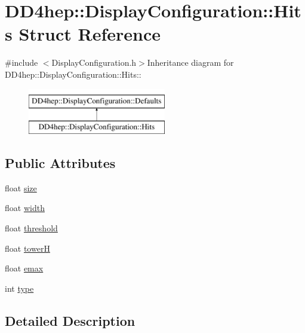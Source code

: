 \hypertarget{struct_d_d4hep_1_1_display_configuration_1_1_hits}{
\section{DD4hep::DisplayConfiguration::Hits Struct Reference}
\label{struct_d_d4hep_1_1_display_configuration_1_1_hits}
}


{\ttfamily \#include $<$DisplayConfiguration.h$>$}Inheritance diagram for DD4hep::DisplayConfiguration::Hits::\begin{figure}[H]
\begin{center}
\leavevmode
\includegraphics[height=2cm]{struct_d_d4hep_1_1_display_configuration_1_1_hits}
\end{center}
\end{figure}
\subsection*{Public Attributes}
\begin{DoxyCompactItemize}
\item 
float \hyperlink{struct_d_d4hep_1_1_display_configuration_1_1_hits_ad11b0d78e70f65eab8742ec341a48bd8}{size}
\item 
float \hyperlink{struct_d_d4hep_1_1_display_configuration_1_1_hits_abf1d6b1a1ec5689bd11153429affb607}{width}
\item 
float \hyperlink{struct_d_d4hep_1_1_display_configuration_1_1_hits_ae708bf5cabed5cb9c82734b7bfac0373}{threshold}
\item 
float \hyperlink{struct_d_d4hep_1_1_display_configuration_1_1_hits_a5c2fc0074ea8321a2cea82b3fc856584}{towerH}
\item 
float \hyperlink{struct_d_d4hep_1_1_display_configuration_1_1_hits_ad38efa49f6d6183fd60e34e3d53756a1}{emax}
\item 
int \hyperlink{struct_d_d4hep_1_1_display_configuration_1_1_hits_ae126f3863288c51dc2633ba132e97bb0}{type}
\end{DoxyCompactItemize}


\subsection{Detailed Description}


